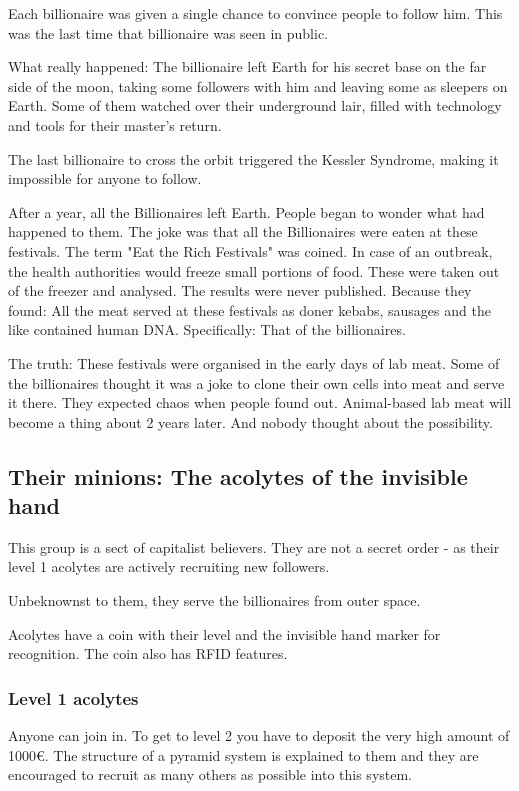 Each billionaire was given a single chance to convince people to follow him. This was the last time that billionaire was seen in public.

What really happened: The billionaire left Earth for his secret base on the far side of the moon, taking some followers with him and leaving some as sleepers on Earth. Some of them watched over their underground lair, filled with technology and tools for their master's return.

The last billionaire to cross the orbit triggered the Kessler Syndrome, making it impossible for anyone to follow.

After a year, all the Billionaires left Earth. People began to wonder what had happened to them. The joke was that all the Billionaires were eaten at these festivals. The term "Eat the Rich Festivals" was coined. In case of an outbreak, the health authorities would freeze small portions of food. These were taken out of the freezer and analysed. The results were never published. Because they found: All the meat served at these festivals as doner kebabs, sausages and the like contained human DNA. Specifically: That of the billionaires.

The truth: These festivals were organised in the early days of lab meat. Some of the billionaires thought it was a joke to clone their own cells into meat and serve it there. They expected chaos when people found out. Animal-based lab meat will become a thing about 2 years later. And nobody thought about the possibility.

\subsection{Their minions: The acolytes of the invisible hand}

This group is a sect of capitalist believers. They are not a secret order - as their level 1 acolytes are actively recruiting new followers.

Unbeknownst to them, they serve the billionaires from outer space.

Acolytes have a coin with their level and the invisible hand marker for recognition. The coin also has RFID features.

\subsubsection{Level 1 acolytes}

Anyone can join in. To get to level 2 you have to deposit the very high amount of 1000€. The structure of a pyramid system is explained to them and they are encouraged to recruit as many others as possible into this system.

